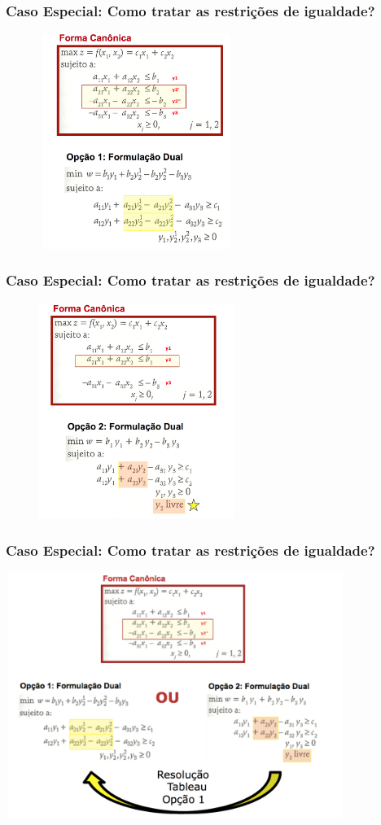 \documentclass{beamer}
\begin{document}
\begin{frame}
	\frametitle{Caso Especial: Como tratar as restrições de igualdade?}
	\centering
	\includegraphics[width=8.5cm,height=7cm]{Opcao1.png}
\end{frame}

\begin{frame}
	\frametitle{Caso Especial: Como tratar as restrições de igualdade?}
	\centering
	\includegraphics[width=8.5cm,height=7cm]{Opcao2.png}
\end{frame}

\begin{frame}
	\frametitle{Caso Especial: Como tratar as restrições de igualdade?}
	\centering
	\includegraphics[width=11cm,height=8cm]{Opcao12.png}
\end{frame}
\end{document}

